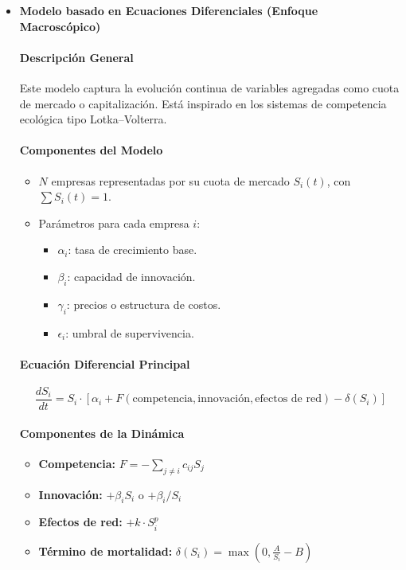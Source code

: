 \documentclass[a4paper,12pt]{article}
\begin{document}
\begin{itemize}
    \item \textbf{Modelo basado en Ecuaciones Diferenciales (Enfoque Macroscópico)}

    \paragraph{Descripción General} Este modelo captura la evolución continua de variables agregadas como cuota de mercado o capitalización. Está inspirado en los sistemas de competencia ecológica tipo Lotka–Volterra.

    \paragraph{Componentes del Modelo}
    \begin{itemize}
        \item $N$ empresas representadas por su cuota de mercado $S_i(t)$, con $\sum S_i(t) = 1$.
        \item Parámetros para cada empresa $i$:
        \begin{itemize}
            \item $\alpha_i$: tasa de crecimiento base.
            \item $\beta_i$: capacidad de innovación.
            \item $\gamma_i$: precios o estructura de costos.
            \item $\epsilon_i$: umbral de supervivencia.
        \end{itemize}
    \end{itemize}

    \paragraph{Ecuación Diferencial Principal}
    \[
    \frac{dS_i}{dt} = S_i \cdot \left[ \alpha_i + F(\text{competencia}, \text{innovación}, \text{efectos de red}) - \delta(S_i) \right]
    \]

    \paragraph{Componentes de la Dinámica}
    \begin{itemize}
        \item \textbf{Competencia:} $F = - \sum_{j \neq i} c_{ij} S_j$
        \item \textbf{Innovación:} $+ \beta_i S_i$ o $+ \beta_i / S_i$
        \item \textbf{Efectos de red:} $+ k \cdot S_i^p$
        \item \textbf{Término de mortalidad:} $\delta(S_i) = \max(0, \frac{A}{S_i} - B)$
    \end{itemize}


\end{itemize}
\end{document}
